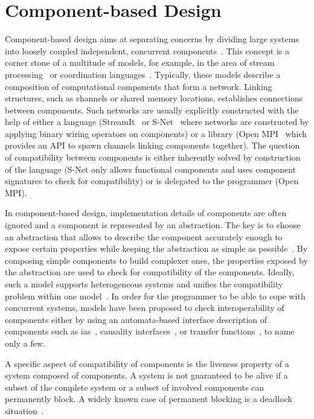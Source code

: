 \section{Component-based Design}
\label{sect_background_comp}
Component-based design aims at separating concerns by dividing large systems into loosely coupled independent, concurrent components~\cite{deAlfaro2005, gossler2002}.
This concept is a corner stone of a multitude of models, for example, in the area of stream processing~\cite{stephens1997} or coordination languages~\cite{papadopoulos1998}.
Typically, these models describe a composition of computational components that form a network.
Linking structures, such as channels or shared memory locations, establishes connections between components.
Such networks are usually explicitly constructed with the help of either a language (\eg StreamIt~\cite{thies2002} or S-Net~\cite{grelck2010} where networks are constructed by applying binary wiring operators on components) or a library (\eg Open MPI~\cite{open-mpi} which provides an API to spawn channels linking components together).
The question of compatibility between components is either inherently solved by construction of the language (S-Net only allows functional components and uses component signatures to check for compatibility) or is delegated to the programmer (Open MPI).

In component-based design, implementation details of components are often ignored and a component is represented by an abstraction.
The key is to choose an abstraction that allows to describe the component accurately enough to expose certain properties while keeping the abstraction as simple as possible~\cite{deAlfaro2005}.
By composing simple components to build complexer ones, the properties exposed by the abstraction are used to check for compatibility of the components.
Ideally, such a model supports heterogeneous systems and unifies the compatibility problem within one model~\cite{gossler2002}.
In order for the programmer to be able to cope with concurrent systems, models have been proposed to check interoperability of components either by using an automata-based interface description of components such as \glspl{ia}~\cite{deAlfaro2001a}, causality interfaces~\cite{zhou2006}, or transfer functions~\cite{thiele2006}, to name only a few.

A specific aspect of compatibility of components is the liveness property of a system composed of components.
A system is not guaranteed to be alive if a subset of the complete system or a subset of involved components can permanently block.
A widely known case of permanent blocking is a deadlock situation~\cite{coffman1971}.

